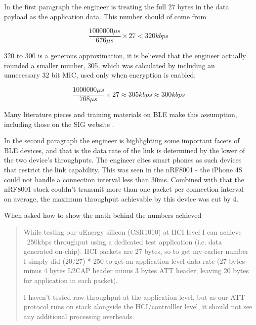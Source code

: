 \documentclass[]{article}
\begin{document}
 In the first paragraph the engineer is treating the full 27 bytes in the data payload as the application data. This number should of come from

\begin{displaymath}
\frac{1000000 \mu s}{676 \mu s} \times 27 < 320 kbps
\end{displaymath}

320 to 300 is a generous approximation, it is believed that the engineer actually rounded a smaller number, 305, which was calculated by including an unnecessary 32 bit \ac{MIC}, used only when encryption is enabled:

\begin{displaymath}
\frac{1000000 \mu s}{708 \mu s} \times 27 \approx 305 kbps \approx 300 kbps
\end{displaymath}

Many literature pieces and training materials on \ac{BLE} make this assumption, including those on the \ac{SIG} website \cite{sig} \cite{sigdebug}. 

In the second paragraph the engineer is highlighting some important facets of \ac{BLE} devices, and that is the data rate of the link is determined by the lower of the two device's throughputs. The engineer cites smart phones as such devices that restrict the link capability. This was seen in the nRF8001 - the iPhone 4S could not handle a connection interval less than 30ms. Combined with that the nRF8001 stack couldn't transmit more than one packet per connection interval on average, the maximum throughput achievable by this device was cut by 4. 

When asked how to show the math behind the numbers achieved

\begin{quote}\itshape

While testing our uEnergy silicon (CSR1010) at HCI level I can achieve 
~250kbps throughput using a dedicated test application (i.e. data 
generated on-chip). HCI packets are 27 bytes, so to get my earlier 
number I simply did (20/27) * 250 to get an application-level data rate 
(27 bytes minus 4 bytes L2CAP header minus 3 bytes ATT header, leaving 
20 bytes for application in each packet).

I haven't tested raw throughput at the application level, but as our ATT 
protocol runs on stack alongside the HCI/controlller level, it should 
not see any additional processing overheads. \text{ \textnormal{[sic]}}

\end{quote}
\end{document}

